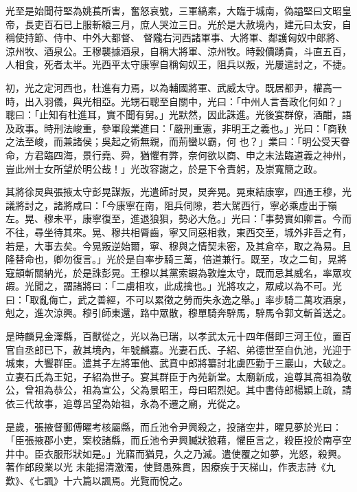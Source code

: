 \begin{pinyinscope}
 光至是始聞苻堅為姚萇所害，奮怒哀號，三軍縞素，大臨于城南，偽謚堅曰文昭皇帝，長吏百石已上服斬縗三月，庶人哭泣三日。光於是大赦境內，建元曰太安，自稱使持節、侍中、中外大都督、
 督隴右河西諸軍事、大將軍、鄰護匈奴中郎將、涼州牧、酒泉公。王穆襲據酒泉，自稱大將軍、涼州牧。時穀價踴貴，斗直五百，人相食，死者太半。光西平太守康寧自稱匈奴王，阻兵以叛，光屢遣討之，不捷。



 初，光之定河西也，杜進有力焉，以為輔國將軍、武威太守。既居都尹，權高一時，出入羽儀，與光相亞。光甥石聰至自關中，光曰：「中州人言吾政化何如？」聰曰：「止知有杜進耳，實不聞有舅。」光默然，因此誅進。光後宴群僚，酒酣，語及政事。時刑法峻重，參軍段業進曰：「嚴刑重憲，非明王之義也。」光曰：「商鞅之法至峻，而兼諸侯；吳起之術無親，而荊蠻以霸，何
 也？」業曰：「明公受天眷命，方君臨四海，景行堯、舜，猶懼有弊，奈何欲以商、申之末法臨道義之神州，豈此州士女所望於明公哉！」光改容謝之，於是下令責躬，及崇寬簡之政。



 其將徐炅與張掖太守彭晃謀叛，光遣師討炅，炅奔晃。晃東結康寧，四通王穆，光議將討之，諸將咸曰：「今康寧在南，阻兵伺隙，若大駕西行，寧必乘虛出于嶺左。晃、穆未平，康寧復至，進退狼狽，勢必大危。」光曰：「事勢實如卿言。今而不往，尋坐待其來。晃、穆共相脣齒，寧又同惡相救，東西交至，城外非吾之有，若是，大事去矣。今晃叛逆始爾，寧、穆與之情契未密，及其倉卒，取之為易。且
 隆替命也，卿勿復言。」光於是自率步騎三萬，倍道兼行。既至，攻之二旬，晃將寇顗斬關納光，於是誅彭晃。王穆以其黨索嘏為敦煌太守，既而忌其威名，率眾攻嘏。光聞之，謂諸將曰：「二虜相攻，此成擒也。」光將攻之，眾咸以為不可。光曰：「取亂侮亡，武之善經，不可以累徵之勞而失永逸之舉。」率步騎二萬攻酒泉，剋之，進次涼興。穆引師東還，路中眾散，穆單騎奔騂馬，騂馬令郭文斬首送之。



 是時麟見金澤縣，百獸從之，光以為已瑞，以孝武太元十四年僭即三河王位，置百官自丞郎已下，赦其境內，年號麟嘉。光妻石氏、子紹、弟德世至自仇池，光迎于
 城東，大饗群臣。遣其子左將軍他、武賁中郎將纂討北虜匹勤于三巖山，大破之。立妻石氏為王妃，子紹為世子。宴其群臣于內苑新堂。太廟新成，追尊其高祖為敬公，曾祖為恭公，祖為宣公，父為景昭王，母曰昭烈妃。其中書侍郎楊穎上疏，請依三代故事，追尊呂望為始祖，永為不遷之廟，光從之。



 是歲，張掖督郵傅曜考核屬縣，而丘池令尹興殺之，投諸空井，曜見夢於光曰：「臣張掖郡小吏，案校諸縣，而丘池令尹興贓狀狼藉，懼臣言之，殺臣投於南亭空井中。臣衣服形狀如是。」光寤而猶見，久之乃滅。遣使覆之如夢，光怒，殺興。著作郎段業以光
 未能揚清激濁，使賢愚殊貫，因療疾于天梯山，作表志詩《九歎》、《七諷》十六篇以諷焉。光覽而悅之。




\end{pinyinscope}
